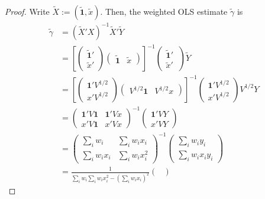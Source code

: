 \documentclass[12pt]{article}
\renewcommand{\(}{\left(}%
\renewcommand{\)}{\right)}%
\renewcommand{\[}{\left[}%
\renewcommand{\]}{\right]}%
\newtheorem{proof}{Proof.}}
\begin{document}
\begin{proof}
	Write $\widetilde{X}:=(\widetilde{ \bm{1}},\widetilde{x})$. Then, the weighted OLS estimate $\widetilde{\gamma}$ is
	\begin{equation*}
		\begin{split}
			\widetilde{\gamma}&=(\widetilde{X}'X)^{-1}\widetilde{X}'\widetilde{Y}\\
			&=\[\begin{pmatrix}
				\widetilde{ \bm{1}}'\\
				\widetilde{x}'
			\end{pmatrix}
			\begin{pmatrix}
				\widetilde{ \bm{1}} & \widetilde{x}
			\end{pmatrix}\]^{-1}\begin{pmatrix}
				\widetilde{ \bm{1}}'\\
				\widetilde{x}'\
			\end{pmatrix}\widetilde{Y}\\\
			&=\[\begin{pmatrix}
				\bm{1}'V^{1/2}\\
				x'V^{1/2}
			\end{pmatrix}
			\begin{pmatrix}
				V^{1/2}\bm{1} & V^{1/2}x
			\end{pmatrix}\]^{-1}\begin{pmatrix}
				\bm{1}'V^{1/2}\\
				x'V^{1/2}
			\end{pmatrix}V^{1/2}Y\\
			&=\begin{pmatrix}
				\bm{1}' V\bm{1} & \bm{1}' Vx\\
				x' V\bm{1} & x'Vx
			\end{pmatrix}^{-1}
			\begin{pmatrix}
				\bm{1}' VY\\
				x' VY
			\end{pmatrix}\\
			&=\begin{pmatrix}
				\sum_i w_i & \sum_iw_ix_i\\
				\sum_iw_ix_i & \sum_iw_ix_i^2
			\end{pmatrix}^{-1}
			\begin{pmatrix}
				\sum_iw_iy_i\\
				\sum_iw_ix_i y_i
			\end{pmatrix}\\
			&=\frac{1}{\sum_i w_i\sum_iw_ix_i^2-\(\sum_iw_ix_i\)^2} \begin{pmatrix}

\end{pmatrix}
\end{split}
\end{equation*}
\end{proof}
\end{document}

